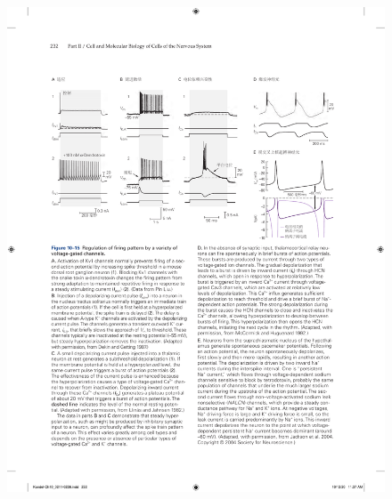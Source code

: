 \begin{figure}[htbp]
	\centering
	\includegraphics[width=0.85\linewidth]{chap10/fig_10_15}

\end{figure}
